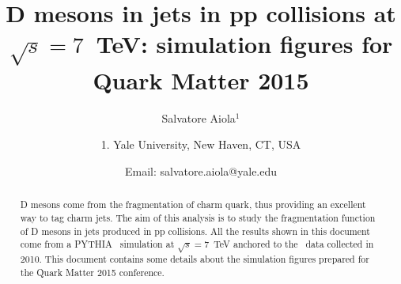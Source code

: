 \documentclass[ALICE,manyauthors]{ALICE_analysis_notes}
\begin{document}
%
%
%
\begin{titlepage}
%
\PHdate{\today}
%
\title{D mesons in jets in pp collisions at $\sqrt{s}=7$~TeV: simulation figures for Quark Matter 2015}
%
\author{Salvatore Aiola$^{1}$}
\author{
1. Yale University, New Haven, CT, USA\\
}
\author{Email: salvatore.aiola@yale.edu}
%
%
\begin{abstract}
D mesons come from the fragmentation of charm quark, thus providing an excellent way to tag charm jets.
The aim of this analysis is to study the fragmentation function of D mesons in jets produced in pp collisions.
All the results shown in this document come from a PYTHIA \pp\ simulation at $\sqrt{s}=7$~TeV anchored to
the \pp\ data collected in 2010.
This document contains some details about the simulation figures prepared for the Quark Matter 2015 conference.
\end{abstract}
\end{titlepage}
%
\tableofcontents
\newpage
\end{document}
